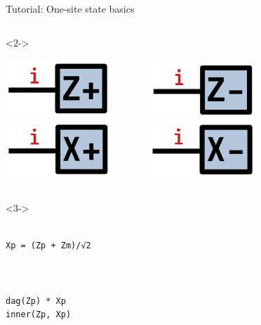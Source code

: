 \begin{frame}[fragile]{Tutorial: One-site state basics}
\begin{columns}
\begin{column}[T]{0.6\textwidth}
\begin{onlyenv}<2->
\vspace*{-0.4cm}
\begin{center}
\includegraphics[width=0.3\textwidth]{
  slides/assets/Zp.png
} \ \ \ \ \ \ \ 
\includegraphics[width=0.3\textwidth]{
  slides/assets/Zm.png
} \\
\includegraphics[width=0.3\textwidth]{
  slides/assets/Xp.png
} \ \ \ \ \ \ \ 
\includegraphics[width=0.3\textwidth]{
  slides/assets/Xm.png
}
\end{center}
\end{onlyenv}
\end{column}

\end{columns}

\begin{columns}

\begin{column}[T]{0.45\textwidth}
\begin{onlyenv}<3->
~\\
~\\
\begin{lstlisting}[language=JuliaLocal, style=julia, basicstyle=\small]
Xp = (Zp + Zm)/√2



dag(Zp) * Xp
inner(Zp, Xp)
\end{lstlisting}
\end{onlyenv}
\end{column}


\end{columns}
\end{frame}
